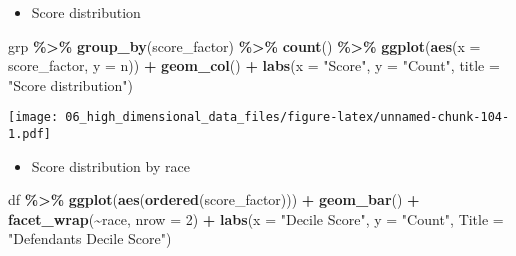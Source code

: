\documentclass[
]{book}
\newenvironment{Shaded}{\begin{snugshade}}{\end{snugshade}}
\newcommand{\DataTypeTok}[1]{\textcolor[rgb]{0.13,0.29,0.53}{#1}}
\newcommand{\DecValTok}[1]{\textcolor[rgb]{0.00,0.00,0.81}{#1}}
\newcommand{\KeywordTok}[1]{\textcolor[rgb]{0.13,0.29,0.53}{\textbf{#1}}}
\newcommand{\NormalTok}[1]{#1}
\newcommand{\OperatorTok}[1]{\textcolor[rgb]{0.81,0.36,0.00}{\textbf{#1}}}
\newcommand{\StringTok}[1]{\textcolor[rgb]{0.31,0.60,0.02}{#1}}
\providecommand{\tightlist}{%
  \setlength{\itemsep}{0pt}\setlength{\parskip}{0pt}}
\begin{document}
\begin{itemize}
\tightlist
\item
  Score distribution
\end{itemize}

\begin{Shaded}
\begin{Highlighting}[]
\NormalTok{grp }\OperatorTok{\%\textgreater{}\%}\StringTok{ }
\StringTok{    }\KeywordTok{group\_by}\NormalTok{(score\_factor) }\OperatorTok{\%\textgreater{}\%}
\StringTok{      }\KeywordTok{count}\NormalTok{() }\OperatorTok{\%\textgreater{}\%}
\StringTok{      }\KeywordTok{ggplot}\NormalTok{(}\KeywordTok{aes}\NormalTok{(}\DataTypeTok{x =}\NormalTok{ score\_factor, }\DataTypeTok{y =}\NormalTok{ n)) }\OperatorTok{+}
\StringTok{        }\KeywordTok{geom\_col}\NormalTok{() }\OperatorTok{+}
\StringTok{        }\KeywordTok{labs}\NormalTok{(}\DataTypeTok{x =} \StringTok{"Score"}\NormalTok{,}
             \DataTypeTok{y =} \StringTok{"Count"}\NormalTok{,}
             \DataTypeTok{title =} \StringTok{"Score distribution"}\NormalTok{)}
\end{Highlighting}
\end{Shaded}

\texttt{[image: 06\_high\_dimensional\_data\_files/figure-latex/unnamed-chunk-104-1.pdf]}

\begin{itemize}
\tightlist
\item
  Score distribution by race
\end{itemize}

\begin{Shaded}
\begin{Highlighting}[]
\NormalTok{df }\OperatorTok{\%\textgreater{}\%}
\StringTok{  }\KeywordTok{ggplot}\NormalTok{(}\KeywordTok{aes}\NormalTok{(}\KeywordTok{ordered}\NormalTok{(score\_factor))) }\OperatorTok{+}\StringTok{ }
\StringTok{          }\KeywordTok{geom\_bar}\NormalTok{() }\OperatorTok{+}
\StringTok{          }\KeywordTok{facet\_wrap}\NormalTok{(}\OperatorTok{\textasciitilde{}}\NormalTok{race, }\DataTypeTok{nrow =} \DecValTok{2}\NormalTok{) }\OperatorTok{+}
\StringTok{          }\KeywordTok{labs}\NormalTok{(}\DataTypeTok{x =} \StringTok{"Decile Score"}\NormalTok{,}
               \DataTypeTok{y =} \StringTok{"Count"}\NormalTok{,}
               \DataTypeTok{Title =} \StringTok{"Defendant\textquotesingle{}s Decile Score"}\NormalTok{)}
\end{Highlighting}
\end{Shaded}
\end{document}
